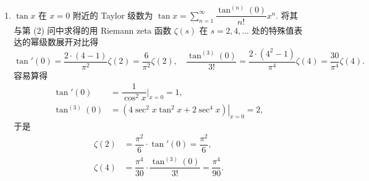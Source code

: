 \begin{solution}
\begin{enumerate}
\item $\tan x$ 在 $x = 0$ 附近的 Taylor 级数为 $\displaystyle \tan x = \sum_{n=1}^\infty \dfrac{\tan^{(n)}(0)}{n!} x^n.$ 将其与第 (2) 问中求得的用 Riemann zeta 函数 $\zeta(s)$ 在 $s = 2, 4, \dots$ 处的特殊值表达的幂级数展开对比得
\begin{equation*}
\tan'(0) = \dfrac{2\cdot(4-1)}{\pi^2} \zeta(2) = \dfrac{6}{\pi^2} \zeta(2), \quad \dfrac{\tan^{(3)}(0)}{3!} = \dfrac{2\cdot(4^2-1)}{\pi^4} \zeta(4) = \dfrac{30}{\pi^4} \zeta(4).
\end{equation*}
容易算得
\begin{align*}
\tan'(0) & = \dfrac{1}{\cos^2x} \bigg|_{x=0} = 1, \\
\tan^{(3)}(0) & = \left.(4\sec^2 x \tan^2 x + 2\sec^4 x)\right|_{x=0} = 2,
\end{align*}
于是 
\begin{align*}
\zeta(2) & = \dfrac{\pi^2}{6} \cdot \tan'(0) = \dfrac{\pi^2}{6}, \\
\zeta(4) & = \dfrac{\pi^4}{30} \cdot \dfrac{\tan^{(3)}(0)}{3!} = \dfrac{\pi^4}{90}.
\end{align*}
\end{enumerate}
\end{solution}



